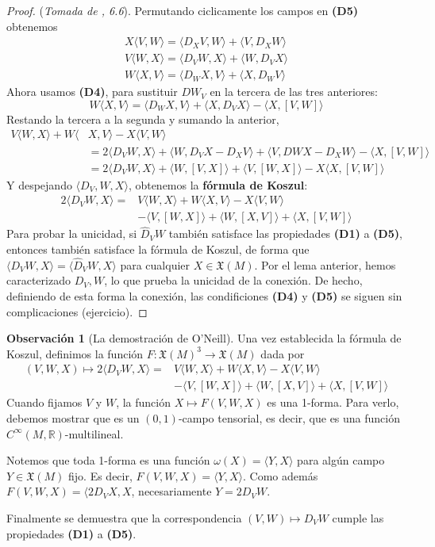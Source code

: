 \documentclass[spanish]{book}
\theoremstyle{definition}
\newtheorem*{obs}{Observación}
\newcommand{\R}{\mathbb{R}}
\newcommand{\X}{\mathfrak{X}}
\newcommand{\Cinf}{C^\infty}
\begin{document}
	
	\begin{proof}
		(\textit{Tomada de \cite{Loring-dif}, 6.6}). Permutando ciclicamente los campos en \textbf{(D5)} obtenemos
		\begin{align*}
			X\langle V,W\rangle=\langle D_XV,W\rangle+\langle V,D_XW\rangle\\
			V\langle W,X\rangle=\langle D_VW,X\rangle+\langle W,D_VX\rangle\\
			W\langle X,V\rangle=\langle D_WX,V\rangle+\langle X,D_WV\rangle
		\end{align*}
		Ahora usamos \textbf{(D4)}, para sustituir $DW_V$ en la tercera de las tres anteriores:
			\[W\langle X,V\rangle=\langle D_WX,V\rangle+\langle X,D_VX\rangle-\langle X,[V,W]\rangle\]
		Restando la tercera a la segunda y sumando la anterior,
		\begin{align*}
			V\langle W,X\rangle+W\langle &X,V\rangle-X\langle V,W\rangle\\
			&=2\langle D_VW,X\rangle+\langle W,D_VX-D_XV\rangle+\langle V,DWX-D_XW\rangle-\langle X,[V,W]\rangle\\
			&=2\langle D_VW,X\rangle+\langle W,[V,X]\rangle +\langle V,[W,X]\rangle-X\langle X,[V,W]\rangle
		\end{align*}
		Y despejando $\langle D_V,W,X\rangle$, obtenemos la \textbf{fórmula de Koszul}:
	\begin{align*}
		2\langle D_VW,X\rangle=&V\langle W,X\rangle+W\langle X,V\rangle-X\langle V,W\rangle\\
		&-\langle V,[W,X]\rangle+\langle W,[X,V]\rangle+\langle X,[V,W]\rangle
	\end{align*}
	Para probar la unicidad, si $\hat{D}_VW$ también satisface las propiedades \textbf{(D1)} a \textbf{(D5)}, entonces también satisface la fórmula de Koszul, de forma que $\langle D_VW,X\rangle=\langle \hat{D}_VW,X\rangle$ para cualquier $X\in\X(M)$. Por el lema anterior, hemos caracterizado $D_V,W$, lo que prueba la unicidad de la conexión. De hecho, definiendo de esta forma la conexión, las condificiones \textbf{(D4)} y \textbf{(D5)} se siguen sin complicaciones (ejercicio).
	\end{proof}
	\begin{obs}[La demostración de O'Neill]
		Una vez establecida la fórmula de Koszul, definimos la función $F:\X(M)^3\to\X(M)$ dada por
		\begin{align*}
			(V,W,X)\mapsto2\langle D_VW,X\rangle=&V\langle W,X\rangle+W\langle X,V\rangle-X\langle V,W\rangle\\
			&-\langle V,[W,X]\rangle+\langle W,[X,V]\rangle+\langle X,[V,W]\rangle
		\end{align*}
		Cuando fijamos $V$ y $W$, la función $X\mapsto F(V,W,X)$ es una 1-forma. Para verlo, debemos mostrar que es un $(0,1)$-campo tensorial, es decir, que es una función $\Cinf(M,\R)$-multilineal.
		
		Notemos que toda 1-forma es una función $\omega(X)=\langle Y,X\rangle$ para algún campo $Y\in\X(M)$ fijo. Es decir, $F(V,W,X)=\langle Y,X\rangle$. Como además $F(V,W,X)=\langle 2D_VX,X$, necesariamente $Y=2D_VW$.
		
		Finalmente se demuestra que la correspondencia $(V,W)\mapsto D_VW$ cumple las propiedades \textbf{(D1)} a \textbf{(D5)}.
	\end{obs}
\end{document}
